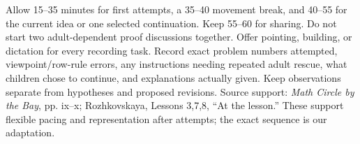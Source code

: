\documentclass[11pt]{article}
\begin{document}
Allow 15--35 minutes for first attempts, a 35--40 movement break, and 40--55 for the current idea or one selected continuation. Keep 55--60 for sharing. Do not start two adult-dependent proof discussions together. Offer pointing, building, or dictation for every recording task.
Record exact problem numbers attempted, viewpoint/row-rule errors, any instructions needing repeated adult rescue, what children chose to continue, and explanations actually given. Keep observations separate from hypotheses and proposed revisions. Source support: \emph{Math Circle by the Bay}, pp. ix--x; Rozhkovskaya, Lessons 3,7,8, ``At the lesson.'' These support flexible pacing and representation after attempts; the exact sequence is our adaptation.
\end{document}
